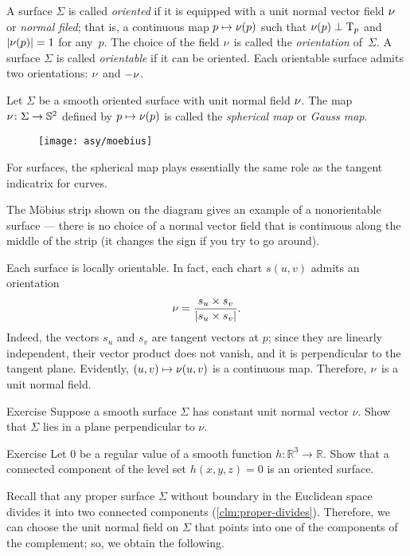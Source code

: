 A surface $\Sigma$ is called \emph{oriented} if it is equipped with a unit normal vector field $\nu$ or \emph{normal filed};
that is, a continuous map $p\mapsto \nu(p)$ such that $\nu(p)\perp\mathrm{T}_p$ and $|\nu(p)|=1$ for any~$p$.
The choice of the field $\nu$ is called the {}\emph{orientation} of~$\Sigma$.
A surface $\Sigma$ is called {}\emph{orientable} if it can be oriented.
Each orientable surface admits two orientations: $\nu$ and $-\nu$.

Let $\Sigma$ be a smooth oriented surface with unit normal field $\nu$.
The map $\nu\colon\Sigma\to \mathbb{S}^2$ defined by $p\mapsto \nu(p)$ is called the \emph{spherical map} or \emph{Gauss map}.

\begin{wrapfigure}{r}{42 mm}
\vskip-7mm
\centering
\texttt{[image: asy/moebius]}
\vskip-1mm
\end{wrapfigure}

For surfaces, the spherical map plays essentially the same role as the tangent indicatrix for curves.

The Möbius strip shown on the diagram gives an example of a nonorientable surface --- there is no choice of a normal vector field that is continuous along the middle of the strip (it changes the sign if you try to go around).

Each surface is locally orientable.
In fact, each chart $s(u,v)$ admits an orientation 
\[\nu=
\frac{s_u\times s_v}
{\left|s_u\times s_v\right|}.\]
Indeed, the vectors $s_u$ and $s_v$ are tangent vectors at $p$; 
since they are linearly independent, their vector product does not vanish, and it is perpendicular to the tangent plane.
Evidently, $(u,v)\mapsto \nu(u,v)$ is a continuous map.
Therefore, $\nu$ is a unit normal field. 

\begin{thm}{Exercise}\label{ex:const-normal}
Suppose a smooth surface $\Sigma$ has constant unit normal vector $\nu$.
Show that $\Sigma$ lies in a plane perpendicular to $\nu$.
\end{thm}

\begin{thm}{Exercise}\label{ex:implicit-orientable}
Let $0$ be a regular value of a smooth function $h:\mathbb{R}^3\to\mathbb{R}$.
Show that a connected component of the level set $h(x,y,z)=0$ is an oriented surface.
\end{thm}

Recall that any proper surface $\Sigma$ without boundary in the Euclidean space divides it into two connected components (\ref{clm:proper-divides}).
Therefore, we can choose the unit normal field on $\Sigma$ that points into one of the components of the complement; so, we obtain the following.


